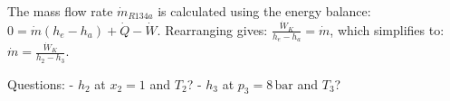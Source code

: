 The mass flow rate \( \dot{m}_{R134a} \) is calculated using the energy balance:  
\( 0 = \dot{m} (h_e - h_a) + \dot{Q} - \dot{W} \).  
Rearranging gives:  
\( \frac{\dot{W}_{K}}{h_e - h_a} = \dot{m} \),  
which simplifies to:  
\( \dot{m} = \frac{\dot{W}_{K}}{h_2 - h_3} \).  

Questions:  
- \( h_2 \) at \( x_2 = 1 \) and \( T_2 \)?  
- \( h_3 \) at \( p_3 = 8 \, \text{bar} \) and \( T_3 \)?